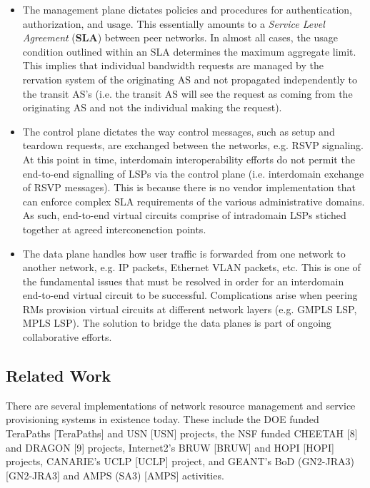 \documentclass[conference]{IEEEtran}
\begin{document}
\begin{itemize}
\item
The management plane dictates policies and procedures for authentication, 
authorization, and usage.  This essentially amounts to a \emph{Service Level 
Agreement} (\textbf{SLA}) between peer networks.  In almost all cases, the usage 
condition outlined within an SLA determines the maximum aggregate limit.  
This implies that individual bandwidth requests are managed by the rervation 
system of the originating AS and not propagated independently to the transit AS's 
(i.e. the transit AS will see the request as coming from the originating AS and not the individual making the request).

\item
The control plane dictates the way control messages, such as setup and 
teardown requests, are exchanged between the networks, e.g. RSVP signaling.
At this point in time, interdomain interoperability efforts do not permit
the end-to-end signalling of LSPs via the control plane (i.e. interdomain exchange of RSVP messages).  This is because
there is no vendor implementation that can enforce complex SLA requirements of the
various administrative domains.  As such, end-to-end virtual circuits comprise
of intradomain LSPs stiched together at agreed interconenction points.

\item
The data plane handles how user traffic is forwarded from one network to 
another network, e.g. IP packets, Ethernet VLAN packets, etc.  This is one of the fundamental issues that must be resolved in order for an interdomain end-to-end virtual circuit to be successful.  Complications arise when peering RMs provision virtual circuits at different network layers (e.g. GMPLS LSP, MPLS LSP).  The solution to bridge the data planes is part of ongoing collaborative efforts.
\end{itemize}


\subsection{Related Work}

There are several implementations of network resource management and
service provisioning systems in existence today.  These include the DOE funded
TeraPaths [TeraPaths] and USN [USN] projects, the NSF funded CHEETAH [8] and DRAGON [9] projects,
Internet2's BRUW [BRUW] and HOPI [HOPI] projects,  CANARIE's UCLP [UCLP] project, and GEANT's
BoD (GN2-JRA3) [GN2-JRA3] and AMPS (SA3) [AMPS] activities.
\end{document}
